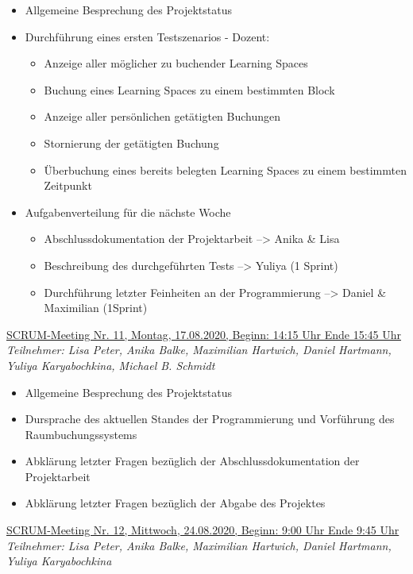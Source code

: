 \documentclass[a4paper,report,headsepline]{scrreprt}
\begin{document}
\begin{itemize}
\item Allgemeine Besprechung des Projektstatus
\item Durchführung eines ersten Testszenarios - Dozent: 
\begin{itemize}
\item Anzeige aller möglicher zu buchender Learning Spaces
\item Buchung eines Learning Spaces zu einem bestimmten Block
\item Anzeige aller persönlichen getätigten Buchungen
\item Stornierung der getätigten Buchung
\item Überbuchung eines bereits belegten Learning Spaces zu einem bestimmten Zeitpunkt
\end{itemize}
\item Aufgabenverteilung für die nächste Woche
\begin{itemize}
\item Abschlussdokumentation der Projektarbeit --> Anika \& Lisa
\item Beschreibung des durchgeführten Tests --> Yuliya (1 Sprint)
\item Durchführung letzter Feinheiten an der Programmierung --> Daniel \& Maximilian (1Sprint)

\end{itemize}
\end{itemize}
\underline{{\large SCRUM-Meeting Nr. 11, Montag, 17.08.2020, Beginn: 14:15 Uhr Ende 15:45 Uhr }} \\
\textit{Teilnehmer: Lisa Peter, Anika Balke, Maximilian Hartwich, Daniel Hartmann, Yuliya Karyabochkina, Michael B. Schmidt }

\begin{itemize}
\item Allgemeine Besprechung des Projektstatus 
\item Dursprache des aktuellen Standes der Programmierung und Vorführung des Raumbuchungssystems 
\item Abklärung letzter Fragen bezüglich der Abschlussdokumentation der Projektarbeit 
\item Abklärung letzter Fragen bezüglich der Abgabe des Projektes 
\end{itemize}
\underline{{\large SCRUM-Meeting Nr. 12, Mittwoch, 24.08.2020, Beginn: 9:00 Uhr Ende 9:45 Uhr}} \\
\textit{Teilnehmer: Lisa Peter, Anika Balke, Maximilian Hartwich, Daniel Hartmann, Yuliya Karyabochkina}
\end{document}
